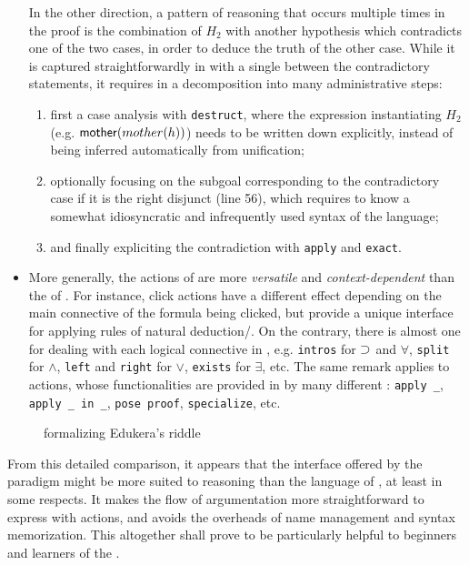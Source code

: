 \begin{itemize}
  In the other direction, a pattern of reasoning that occurs multiple times in
  the proof is the combination of $H_2$ with another hypothesis which
  contradicts one of the two cases, in order to deduce the truth of the other
  case. While it is captured straightforwardly in  with a single 
  between the contradictory statements, it requires in  a decomposition into
  many administrative steps:
  \begin{enumerate}
    \item first a case analysis with \texttt{destruct}, where the expression
    instantiating $H_2$ (e.g. $\mbox{\textsf{mother}}(mother(h))$) needs to be written down
    explicitly, instead of being inferred automatically from unification;
    \item optionally focusing on the subgoal corresponding to the contradictory
    case if it is the right disjunct (line 56), which requires to know a
    somewhat idiosyncratic and infrequently used syntax of the  language;
    \item and finally expliciting the contradiction with \texttt{apply} and
    \texttt{exact}.
  \end{enumerate}

  \item More generally, the actions of  are more \emph{versatile} and
  \emph{context-dependent} than the  of . For instance, click actions
  have a different effect depending on the main connective of the formula being
  clicked, but provide a unique interface for applying rules of natural
  deduction/. On the contrary, there is almost one  for
  dealing with each logical connective in , e.g. \texttt{intros} for $\supset$
  and $\forall$, \texttt{split} for $\land$, \texttt{left} and \texttt{right}
  for $\lor$, \texttt{exists} for $\exists$, etc. The same remark applies to 
  actions, whose functionalities are provided in  by many different :
  \texttt{apply \_}, \texttt{apply \_ in \_}, \texttt{pose proof},
  \texttt{specialize}, etc.
\end{itemize}

\begin{figure}
  
  \caption{  formalizing Edukera's riddle}
\end{figure}

From this detailed comparison, it appears that the interface offered by the
 paradigm might be more suited to  reasoning than the
 language of , at least in some respects. It makes the flow of
argumentation more straightforward to express with  actions, and avoids the
overheads of name management and syntax memorization. This altogether shall
prove to be particularly helpful to beginners and learners of the .


